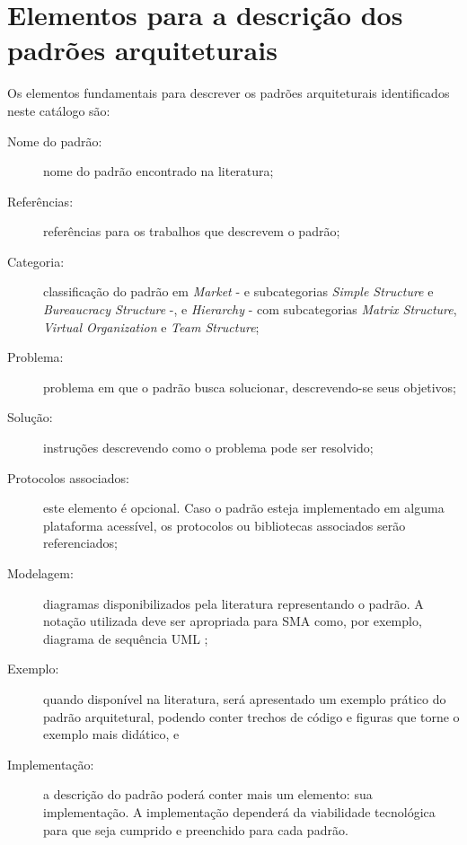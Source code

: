 \section{Elementos para a descrição dos padrões arquiteturais}\label{subsec:elementos_descricao_dos_padroes}

Os elementos fundamentais para descrever os padrões arquiteturais identificados neste catálogo são:

\begin{description}
    \item[Nome do padrão:] nome do padrão encontrado na literatura;
    \item[Referências:] referências para os trabalhos que descrevem o padrão;
    \item[Categoria:] classificação do padrão em \textit{Market} - e subcategorias \textit{Simple Structure} e \textit{Bureaucracy Structure} -, e \textit{Hierarchy} - com subcategorias \textit{Matrix Structure}, \textit{Virtual Organization} e \textit{Team Structure};
    \item[Problema:] problema em que o padrão busca solucionar, descrevendo-se seus objetivos;
    \item[Solução:] instruções descrevendo como o problema pode ser resolvido;
    \item[Protocolos associados:] este elemento é opcional. Caso o padrão esteja implementado em alguma plataforma acessível, os protocolos ou bibliotecas associados serão referenciados;
    \item[Modelagem:] diagramas disponibilizados pela literatura representando o padrão. A notação utilizada deve ser apropriada para SMA como, por exemplo, diagrama de sequência UML \cite{larman2002utilizando};
    \item[Exemplo:] quando disponível na literatura, será apresentado um exemplo prático do padrão arquitetural, podendo conter trechos de código e figuras que torne o exemplo mais didático, e
    \item[Implementação:] a descrição do padrão poderá conter mais um elemento: sua implementação. A implementação dependerá da viabilidade tecnológica para que seja cumprido e preenchido para cada padrão.
\end{description}


